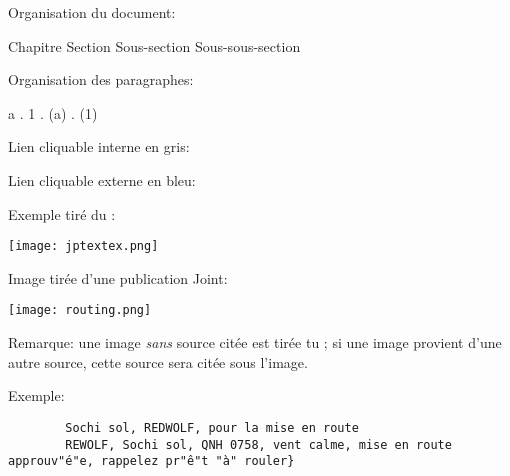 
%

\begin{e1}
	\item Organisation du document:

	{\Large Chapitre} {\large Section} Sous-section {\small Sous-sous-section}

	\item Organisation des paragraphes:

	{\Large a} . {\large 1} . (a) . {\small (1)}
	
	\item Lien cliquable interne en \textcolor{\intlink}{gris}:
	
	
	\item Lien cliquable externe en \textcolor{\extlink}{bleu}:
	
	\thirdwing
	

	\item Exemple tiré du \jp{}:

	\texttt{[image: jptextex.png]}

	\item Image tirée d'une publication Joint:

	\texttt{[image: routing.png]}
	
	Remarque: une image \emph{sans} source citée est tirée tu \jp{}; si une image provient d'une autre source, cette source sera citée sous l'image.

	\item Exemple:
	\begin{lstlisting}
		Sochi sol, REDWOLF, pour la mise en route
		REWOLF, Sochi sol, QNH 0758, vent calme, mise en route approuv"é"e, rappelez pr"ê"t "à" rouler}
	\end{lstlisting}


\end{e1}
